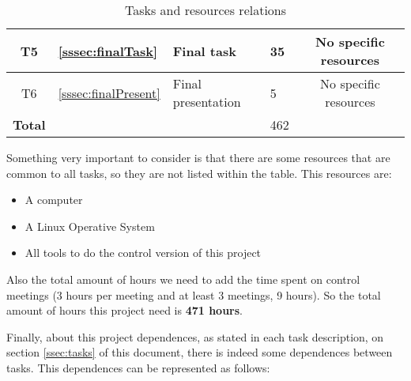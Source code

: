\begin{table}[!htb]
\begin{tabular}{| c | l | l | l | c |}
  T5 &   \ref{sssec:finalTask} & Final task & 35 &  No specific resources  \\ \hline 
  T6 &   \ref{sssec:finalPresent} & Final presentation & 5 &  No specific resources  \\ \hline \hline
  \textbf{Total} &  &  & 462 & \\ \hline 
  \end{tabular}
  \caption{Tasks and resources relations} \vspace{3pt}
  \label{tab:relation}
\end{table}

Something very important to consider is that there are some resources that are common to all tasks, so they are not listed within the table. This resources are:
\begin{itemize}
\item A computer
\item A Linux Operative System
\item All tools to do the control version of this project
\end{itemize}

Also the total amount of hours we need to add the time spent on control meetings (3 hours per meeting and at least 3 meetings, 9 hours). So the total amount of hours this project need is \textbf{471 hours}.

Finally, about this project dependences, as stated in each task description, on section \ref{ssec:tasks} of this document, there is indeed some dependences between tasks. This dependences can be represented as follows:

